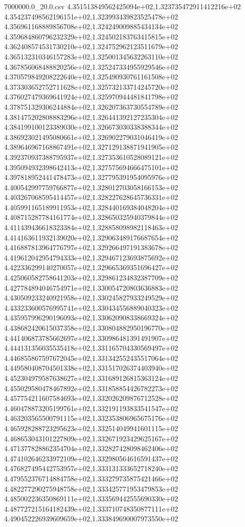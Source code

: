 \begin{filecontents*}{7000000.0_20.0.csv}
4.351513849562425094e+02,1.323735472911412216e+02
4.354237498562196151e+02,1.323993439823525478e+02
4.356961168889856708e+02,1.324249009885434134e+02
4.359684860796232329e+02,1.324502183763415815e+02
4.362408574531730210e+02,1.324752962123511679e+02
4.365132310346157283e+02,1.325001345632263110e+02
4.367856068488820256e+02,1.325247334955929546e+02
4.370579849208222640e+02,1.325490930761161508e+02
4.373303652752711628e+02,1.325732133714245720e+02
4.376027479369641924e+02,1.325970944481841798e+02
4.378751329306244884e+02,1.326207363730554789e+02
4.381475202808883296e+02,1.326441392127235304e+02
4.384199100123389030e+02,1.326673030338388344e+02
4.386923021495080661e+02,1.326902279031046419e+02
4.389646967168867491e+02,1.327129138871941905e+02
4.392370937388795937e+02,1.327353610528089121e+02
4.395094932398642413e+02,1.327575694666475101e+02
4.397818952441478473e+02,1.327795391954095976e+02
4.400542997759766877e+02,1.328012703058166153e+02
4.403267068595414457e+02,1.328227628645736331e+02
4.405991165189911953e+02,1.328440169384048204e+02
4.408715287784161774e+02,1.328650325940379844e+02
4.411439436618323384e+02,1.328858098982118463e+02
4.414163611932139020e+02,1.329063489176687654e+02
4.416887813964776797e+02,1.329266497191383678e+02
4.419612042954794333e+02,1.329467123693875692e+02
4.422336299140270057e+02,1.329665369351696427e+02
4.425060582758641203e+02,1.329861234832387709e+02
4.427784894046754971e+02,1.330054720803636883e+02
4.430509233240921958e+02,1.330245827933249529e+02
4.433233600576995741e+02,1.330434556889040323e+02
4.435957996290196093e+02,1.330620908338669324e+02
4.438682420615037358e+02,1.330804882950196770e+02
4.441406873785662697e+02,1.330986481391491907e+02
4.444131356035535418e+02,1.331165704330569497e+02
4.446855867597672045e+02,1.331342552435517064e+02
4.449580408704501338e+02,1.331517026374403940e+02
4.452304979587638627e+02,1.331689126815363124e+02
4.455029580478467892e+02,1.331858854426782273e+02
4.457754211607584693e+02,1.332026209876712528e+02
4.460478873205199761e+02,1.332191193833541547e+02
4.463203565500791115e+02,1.332353806965675176e+02
4.465928288723295623e+02,1.332514049941601115e+02
4.468653043101227809e+02,1.332671923429625167e+02
4.471377828862354704e+02,1.332827428098462406e+02
4.474102646233972109e+02,1.332980564616591437e+02
4.476827495442753957e+02,1.333131333652718240e+02
4.479552376714884758e+02,1.333279735875421466e+02
4.482277290275948758e+02,1.333425771953479853e+02
4.485002236350869111e+02,1.333569442555690330e+02
4.487727215164182439e+02,1.333710748350877111e+02
4.490452226939609659e+02,1.333849690007973550e+02

\end{filecontents*}
